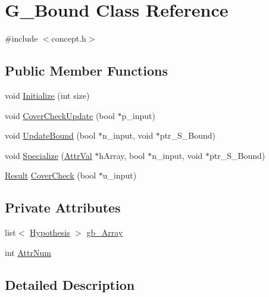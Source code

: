 \hypertarget{class_g___bound}{\section{G\-\_\-\-Bound Class Reference}
\label{class_g___bound}
}


{\ttfamily \#include $<$concept.\-h$>$}

\subsection*{Public Member Functions}
\begin{DoxyCompactItemize}
\item 
void \hyperlink{class_g___bound_a30da552d80a6b169c76cc61410a05b78}{Initialize} (int size)
\item 
void \hyperlink{class_g___bound_a9344fe22bb13d39a425c5a5b690aace4}{Cover\-Check\-Update} (bool $\ast$p\-\_\-input)
\item 
void \hyperlink{class_g___bound_a8b473f262762ac5b74fdb766ded033aa}{Update\-Bound} (bool $\ast$n\-\_\-input, void $\ast$ptr\-\_\-\-S\-\_\-\-Bound)
\item 
void \hyperlink{class_g___bound_a28f2ef635a7a74db831df0f2da088181}{Specialize} (\hyperlink{concept_8h_a9680d29b8d997e4adbf99481b65e897d}{Attr\-Val} $\ast$h\-Array, bool $\ast$n\-\_\-input, void $\ast$ptr\-\_\-\-S\-\_\-\-Bound)
\item 
\hyperlink{concept_8h_a28287671eaf7406afd604bd055ba4066}{Result} \hyperlink{class_g___bound_aea45d16a15dfd2c30985d89f92803b22}{Cover\-Check} (bool $\ast$u\-\_\-input)
\end{DoxyCompactItemize}
\subsection*{Private Attributes}
\begin{DoxyCompactItemize}
\item 
list$<$ \hyperlink{class_hypothesis}{Hypothesis} $>$ \hyperlink{class_g___bound_ace60790dcb7f10a2caa157abe1aa838f}{gb\-\_\-\-Array}
\item 
int \hyperlink{class_g___bound_a7f9e3866c5bf5a55f59949e9b2ff4cce}{Attr\-Num}
\end{DoxyCompactItemize}


\subsection{Detailed Description}


